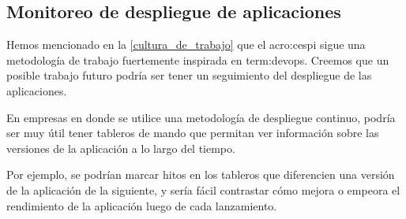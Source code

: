 \subsection{Monitoreo de despliegue de aplicaciones}
\label{del-despliegue-de-aplicaciones}

Hemos mencionado en la \autoref{cultura_de_trabajo} que el \gls{acro:cespi}
sigue una metodología de trabajo fuertemente inspirada en \gls{term:devops}.
Creemos que un posible trabajo futuro podría ser tener un seguimiento del
despliegue de las aplicaciones.

En empresas en donde se utilice una metodología de despliegue continuo, podría
ser muy útil tener tableros de mando que permitan ver información sobre las
versiones de la aplicación a lo largo del tiempo.

Por ejemplo, se podrían marcar hitos en los tableros que diferencien una
versión de la aplicación de la siguiente, y sería fácil contrastar cómo mejora
o empeora el rendimiento de la aplicación luego de cada lanzamiento.
